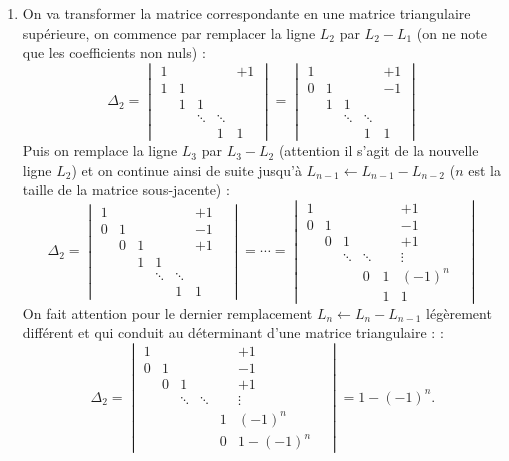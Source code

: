 \documentclass[11pt,a4paper]{article}
\begin{document}
\begin{enumerate}
  \item 
On va transformer la matrice correspondante en une matrice triangulaire supérieure,
on commence par remplacer la ligne $L_2$ par $L_2-L_1$ (on ne note que les coefficients non nuls) : 
$$\Delta_2 =   \begin{vmatrix}
  1 &      &    &   &+1 \\
  1 &1      && &  \\
   &1      &1  & &\\
   & &\ddots &\ddots & \\
  &  &       &1      &1
\end{vmatrix}=
 \begin{vmatrix}
  1 &      &    &   &+1 \\
  0 &1      && &  -1\\
   &1      &1  & &\\
   & &\ddots &\ddots & \\
  &  &       &1      &1
\end{vmatrix}
$$
Puis on remplace la ligne $L_3$ par $L_3-L_2$ (attention il s'agit de la nouvelle ligne $L_2$) et on 
continue ainsi de suite jusqu'à $L_{n-1} \leftarrow L_{n-1}-L_{n-2}$ ($n$ est la taille de la matrice sous-jacente) :
$$\Delta_2 =   \begin{vmatrix}
  1 &      &    &   &&+1 \\
  0 &1      && &  &-1\\
    & 0      &1  & & &+1\\
    & & 1      &1  & && \\
   & &&\ddots &\ddots & \\
  &  &       &&1      &1                 
               \end{vmatrix}
= \cdots = 
\begin{vmatrix}
  1 &      &    &   &&+1 \\
  0 &1      && &  &-1\\
    & 0      &1  & & &+1\\
    & & \ddots      &\ddots  & &\vdots& \\
   & &&0 &1 & (-1)^{n} \\
  &  &       &&1      &1                 
               \end{vmatrix}
$$
On fait attention pour le dernier remplacement $L_n \leftarrow L_n-L_{n-1}$ légèrement différent et qui conduit au déterminant d'une matrice triangulaire : :
$$\Delta_2 = \begin{vmatrix}
  1 &      &    &   &&+1 \\
  0 &1      && &  &-1\\
    & 0      &1  & & &+1\\
    & & \ddots      &\ddots  & &\vdots& \\
   & && &1 & (-1)^{n}\\
  &  &       &&0      &1 - (-1)^{n}                 
               \end{vmatrix}
= 1 - (-1)^{n}.
$$


\end{enumerate}
\end{document}
